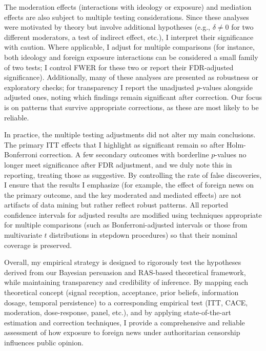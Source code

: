 \documentclass[12pt, american]{article}
\begin{document}
The moderation effects (interactions with ideology or exposure) and mediation effects are also subject to multiple testing considerations. Since these analyses were motivated by theory but involve additional hypotheses (e.g., $\delta \neq 0$ for two different moderators, a test of indirect effect, etc.), I interpret their significance with caution. Where applicable, I adjust for multiple comparisons (for instance, both ideology and foreign exposure interactions can be considered a small family of two tests; I control FWER for these two or report their FDR-adjusted significance). Additionally, many of these analyses are presented as robustness or exploratory checks; for transparency I report the unadjusted $p$-values alongside adjusted ones, noting which findings remain significant after correction. Our focus is on patterns that survive appropriate corrections, as these are most likely to be reliable.

In practice, the multiple testing adjustments did not alter my main conclusions. The primary ITT effects that I highlight as significant remain so after Holm-Bonferroni correction. A few secondary outcomes with borderline $p$-values no longer meet significance after FDR adjustment, and we duly note this in reporting, treating those as suggestive. By controlling the rate of false discoveries, I ensure that the results I emphasize (for example, the effect of foreign news on the primary outcome, and the key moderated and mediated effects) are not artifacts of data mining but rather reflect robust patterns. All reported confidence intervals for adjusted results are modified using techniques appropriate for multiple comparisons (such as Bonferroni-adjusted intervals or those from multivariate $t$ distributions in stepdown procedures) so that their nominal coverage is preserved. 

Overall, my empirical strategy is designed to rigorously test the hypotheses derived from our Bayesian persuasion and RAS-based theoretical framework, while maintaining transparency and credibility of inference. By mapping each theoretical concept (signal reception, acceptance, prior beliefs, information dosage, temporal persistence) to a corresponding empirical test (ITT, CACE, moderation, dose-response, panel, etc.), and by applying state-of-the-art estimation and correction techniques, I provide a comprehensive and reliable assessment of how exposure to foreign news under authoritarian censorship influences public opinion.
\end{document}
